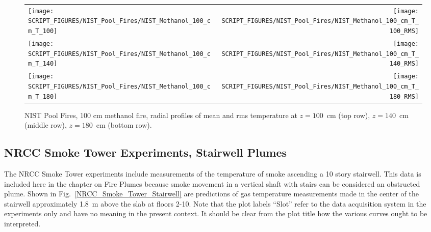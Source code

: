 \begin{figure}[p]
\begin{tabular*}{\textwidth}{l@{\extracolsep{\fill}}r}
\texttt{[image: SCRIPT\_FIGURES/NIST\_Pool\_Fires/NIST\_Methanol\_100\_cm\_T\_100]} &
\texttt{[image: SCRIPT\_FIGURES/NIST\_Pool\_Fires/NIST\_Methanol\_100\_cm\_T\_100\_RMS]} \\
\texttt{[image: SCRIPT\_FIGURES/NIST\_Pool\_Fires/NIST\_Methanol\_100\_cm\_T\_140]} &
\texttt{[image: SCRIPT\_FIGURES/NIST\_Pool\_Fires/NIST\_Methanol\_100\_cm\_T\_140\_RMS]} \\
\texttt{[image: SCRIPT\_FIGURES/NIST\_Pool\_Fires/NIST\_Methanol\_100\_cm\_T\_180]} &
\texttt{[image: SCRIPT\_FIGURES/NIST\_Pool\_Fires/NIST\_Methanol\_100\_cm\_T\_180\_RMS]}
\end{tabular*}
\caption[NIST Pool Fires, 100 cm methanol fire, radial profiles of mean and rms temperature]
{NIST Pool Fires, 100 cm methanol fire, radial profiles of mean and rms temperature at $z=100$~cm (top row), $z=140$~cm (middle row), $z=180$~cm (bottom row).}
\label{NIST_Pool_Fires_Plume_Temps_2}
\end{figure}


\clearpage

\subsection{NRCC Smoke Tower Experiments, Stairwell Plumes}

The NRCC Smoke Tower experiments include measurements of the temperature of smoke ascending a 10 story stairwell. This data is included here in the chapter on Fire Plumes because smoke movement in a vertical shaft with stairs can be considered an obstructed plume. Shown in Fig.~\ref{NRCC_Smoke_Tower_Stairwell} are predictions of gas temperature measurements made in the center of the stairwell approximately 1.8~m above the slab at floors 2-10. Note that the plot labels ``Slot'' refer to the data acquisition system in the experiments only and have no meaning in the present context. It should be clear from the plot title how the various curves ought to be interpreted.

\newpage

